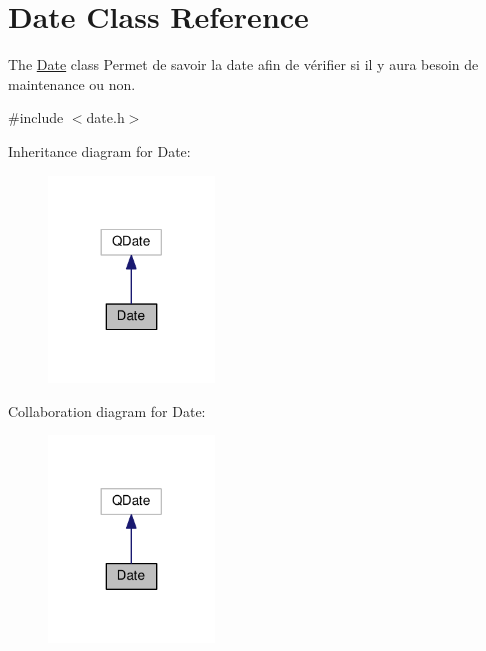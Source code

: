 \hypertarget{class_date}{}\section{Date Class Reference}
\label{class_date}


The \hyperlink{class_date}{Date} class Permet de savoir la date afin de vérifier si il y aura besoin de maintenance ou non.  




{\ttfamily \#include $<$date.\+h$>$}



Inheritance diagram for Date\+:\nopagebreak
\begin{figure}[H]
\begin{center}
\leavevmode
\includegraphics[width=125pt]{class_date__inherit__graph}
\end{center}
\end{figure}


Collaboration diagram for Date\+:\nopagebreak
\begin{figure}[H]
\begin{center}
\leavevmode
\includegraphics[width=125pt]{class_date__coll__graph}
\end{center}
\end{figure}
